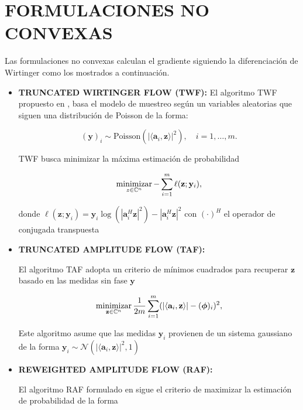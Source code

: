 \section{FORMULACIONES NO CONVEXAS}
Las formulaciones no convexas calculan el gradiente siguiendo la diferenciación de Wirtinger como los mostrados a continuación.
\begin{itemize}
    \item \textbf{TRUNCATED WIRTINGER FLOW (TWF):}
    El algoritmo TWF propuesto en , basa el modelo de muestreo según un variables aleatorias que siguen una distribución de Poisson de la forma:
    
    \begin{equation}
        (\mathbf{y})_i\sim \mathrm{Poisson}( \vert \langle \mathbf{a}_i,\mathbf{z}\rangle \vert^2 ), \quad i=1,\dots,m.
    \end{equation}
    
    TWF busca minimizar la máxima estimación de probabilidad 
    
    \begin{equation}
        \operatorname*{minimizar}_{z \in \mathbb{C}^{n}} - \sum_{i=1}^{m} \ell(\mathbf{z};\mathbf{y}_i),
    \end{equation}
    
    donde $\ell(\mathbf{z};\mathbf{y}_i) = { \mathbf{y}_i\log(|\mathbf{a}_i^H \mathbf{z}|^2) -|\mathbf{a}_i^H \mathbf{z}|^2 }$ con $(\cdot)^H$ el operador de conjugada transpuesta
    
    \item \textbf{TRUNCATED AMPLITUDE FLOW (TAF):}

    El algoritmo TAF  adopta un criterio de mínimos cuadrados para recuperar $\mathbf{z}$ basado en las medidas sin fase $\mathbf{y}$ 
    
    \begin{equation}
        \operatorname*{minimizar}_{\mathbf{z} \in \mathbb{C}^{n}} \frac{1}{2m} \sum_{i=1}^{m} (\vert \langle \mathbf{a}_i,\mathbf{z}\rangle \vert - (\boldsymbol{\phi})_i)^2,
    \end{equation}
    
    Este algoritmo asume que las medidas $\mathbf{y}_i$ provienen de un sistema gaussiano de la forma $\mathbf{y}_i \sim \mathcal{N}(\vert \langle \mathbf{a}_i,\mathbf{z}\rangle \vert^2, 1)$
    
    \item \textbf{REWEIGHTED AMPLITUDE FLOW (RAF):}

    El algoritmo RAF formulado en  sigue el criterio de maximizar la estimación de probabilidad de la forma
    

\end{itemize}
